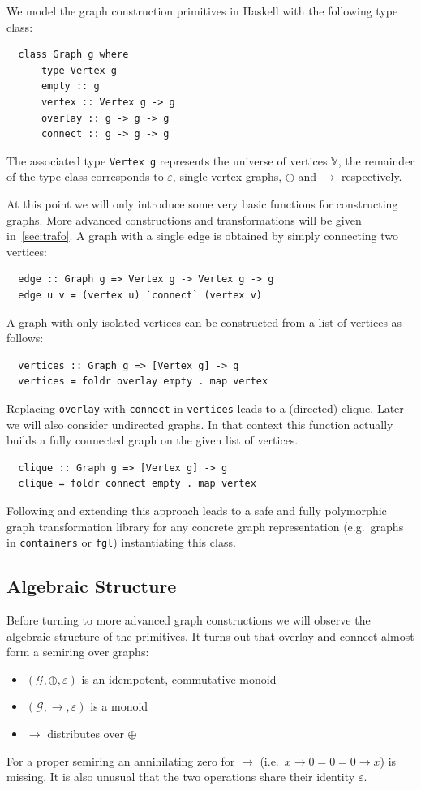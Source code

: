\documentclass{article}
\newcommand{\hs}{\texttt}
\renewcommand{\epsilon}{\varepsilon}
\newcommand{\eps}{\epsilon}
\newcommand{\overlay}{\oplus}
\newcommand{\connect}{\rightarrow}
\begin{document}
We model the graph construction primitives in Haskell with the following type
class:
\begin{verbatim}
  class Graph g where
      type Vertex g
      empty :: g
      vertex :: Vertex g -> g
      overlay :: g -> g -> g
      connect :: g -> g -> g
\end{verbatim}
The associated type \hs{Vertex g} represents the universe of vertices
$\mathbb{V}$, the remainder of the type class corresponds to $\eps$, single
vertex graphs, $\overlay$ and $\connect$ respectively.

At this point we will only introduce some very basic functions for constructing
graphs. More advanced constructions and transformations will be given
in~\autoref{sec:trafo}. A graph with a single edge is obtained by simply
connecting two vertices:
\begin{verbatim}
  edge :: Graph g => Vertex g -> Vertex g -> g
  edge u v = (vertex u) `connect` (vertex v)
\end{verbatim}
A graph with only isolated vertices can be constructed from a list of vertices
as follows:
\begin{verbatim}
  vertices :: Graph g => [Vertex g] -> g
  vertices = foldr overlay empty . map vertex
\end{verbatim}
Replacing \hs{overlay} with \hs{connect} in \hs{vertices} leads to a (directed)
clique. Later we will also consider undirected graphs. In that context this
function actually builds a fully connected graph on the given list of vertices.
\begin{verbatim}
  clique :: Graph g => [Vertex g] -> g
  clique = foldr connect empty . map vertex
\end{verbatim}
Following and extending this approach leads to a safe and fully polymorphic
graph transformation library for any concrete graph representation (e.g.\ graphs
in \texttt{containers} or \texttt{fgl}) instantiating this class.

\subsection{Algebraic Structure}\label{sec:algebra}
Before turning to more advanced graph constructions we will observe the
algebraic structure of the primitives. It turns out that overlay and connect
almost form a semiring over graphs:
\begin{itemize}
\item $(\mathcal{G}, \overlay, \eps)$ is an idempotent, commutative monoid
\item $(\mathcal{G}, \connect, \eps)$ is a monoid
\item $\connect$ distributes over $\overlay$
\end{itemize}
For a proper semiring an annihilating zero for $\connect$ (i.e.\
$x \connect 0 = 0 = 0 \connect x$) is missing. It is also unusual that the two operations
share their identity $\eps$.
\end{document}
